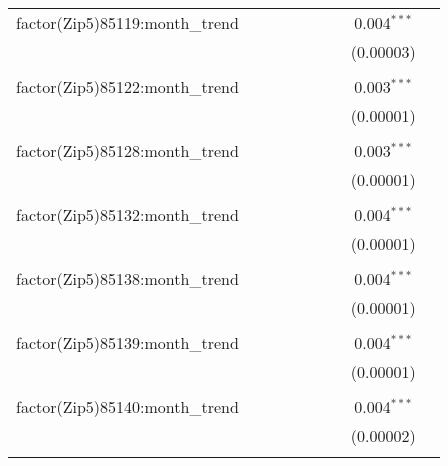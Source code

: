 \begin{table}[H]
{\begin{tabular}{@{\extracolsep{5pt}}lcccccccc}
  factor(Zip5)85119:month\_trend &  &  &  &  &  &  & 0.004$^{***}$ &  \\  

   &  &  &  &  &  &  & (0.00003) &  \\  

   & & & & & & & & \\  

  factor(Zip5)85122:month\_trend &  &  &  &  &  &  & 0.003$^{***}$ &  \\  

   &  &  &  &  &  &  & (0.00001) &  \\  

   & & & & & & & & \\  

  factor(Zip5)85128:month\_trend &  &  &  &  &  &  & 0.003$^{***}$ &  \\  

   &  &  &  &  &  &  & (0.00001) &  \\  

   & & & & & & & & \\  

  factor(Zip5)85132:month\_trend &  &  &  &  &  &  & 0.004$^{***}$ &  \\  

   &  &  &  &  &  &  & (0.00001) &  \\  

   & & & & & & & & \\  

  factor(Zip5)85138:month\_trend &  &  &  &  &  &  & 0.004$^{***}$ &  \\  

   &  &  &  &  &  &  & (0.00001) &  \\  

   & & & & & & & & \\  

  factor(Zip5)85139:month\_trend &  &  &  &  &  &  & 0.004$^{***}$ &  \\  

   &  &  &  &  &  &  & (0.00001) &  \\  

   & & & & & & & & \\  

  factor(Zip5)85140:month\_trend &  &  &  &  &  &  & 0.004$^{***}$ &  \\  

   &  &  &  &  &  &  & (0.00002) &  \\  

   & & & & & & & & \\  


\end{tabular}}
\end{table}
